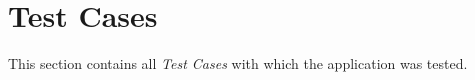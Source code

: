 \chapter{Test Cases}
\label{app:testcases}

This section contains all \textit{Test Cases} with which the application was tested.
